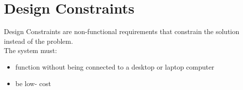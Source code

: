
\section{Design Constraints}
Design Constraints are non-functional requirements that constrain the solution instead of the problem. \\
The system must:
\begin{itemize}
	\item function without being connected to a desktop or laptop computer
	\item be low- cost
\end{itemize}

